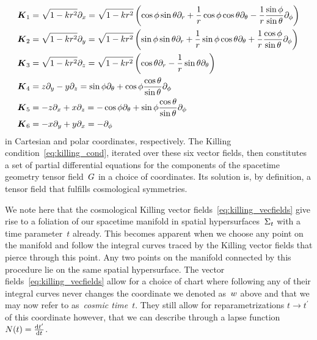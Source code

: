 \begin{subequations}\label{eq:killing_vecfields}
\begin{align}
	\boldsymbol{K}_1&=\sqrt{1-k r{}^2}\partial_x
		=\sqrt{1-k r{}^2}\left(\cos{\phi}\sin{\theta}\partial_r+\frac{1}{r}\cos{\phi}\cos{\theta}\partial_\theta-\frac{1}{r}\frac{\sin{\phi}}{\sin{\theta}}\partial_\phi\right)\\
	\boldsymbol{K}_2&=\sqrt{1-k r{}^2}\partial_y
		=\sqrt{1-k r{}^2}\left(\sin{\phi}\sin{\theta}\partial_r+\frac{1}{r}\sin{\phi}\cos{\theta}\partial_\theta+\frac{1}{r}\frac{\cos{\phi}}{\sin{\theta}}\partial_\phi\right)\\
	\boldsymbol{K}_3&=\sqrt{1-k r{}^2}\partial_z
		=\sqrt{1-k r{}^2}\left(\cos{\theta}\partial_r-\frac{1}{r}\sin{\theta}\partial_\theta\right)\\
	\boldsymbol{K}_4&=z\partial_y-y\partial_z
		=\sin{\phi}\partial_\theta+\cos{\phi}\frac{\cos{\theta}}{\sin{\theta}}\partial_\phi\\
	\boldsymbol{K}_5&=-z\partial_x+x\partial_z
		=-\cos{\phi}\partial_\theta+\sin{\phi}\frac{\cos{\theta}}{\sin{\theta}}\partial_\phi\\
	\boldsymbol{K}_6&=-x\partial_y+y\partial_x
		=-\partial_\phi
\end{align}
\end{subequations}
in Cartesian and polar coordinates, respectively. The Killing condition~\eqref{eq:killing_cond}, iterated over these six vector fields, then constitutes a set of partial differential equations for the components of the spacetime geometry tensor field~$G$ in a choice of coordinates. Its solution is, by definition, a tensor field that fulfills cosmological symmetries.


We note here that the cosmological Killing vector fields~\eqref{eq:killing_vecfields} give rise to a foliation of our spacetime manifold in spatial hypersurfaces~$\Sigma_t$ with a time parameter~$t$ already. This becomes apparent when we choose any point on the manifold and follow the integral curves traced by the Killing vector fields that pierce through this point. Any two points on the manifold connected by this procedure lie on the same spatial hypersurface. The vector fields~\eqref{eq:killing_vecfields} allow for a choice of chart where following any of their integral curves never changes the coordinate we denoted as~$w$ above and that we may now refer to as~\emph{cosmic time}~$t$. They still allow for reparametrizations $t\to t^\prime$ of this coordinate however, that we can describe through a lapse function~${\Nlapse\oft=\frac{\dif{t^\prime}}{\dif{t}}}$.

